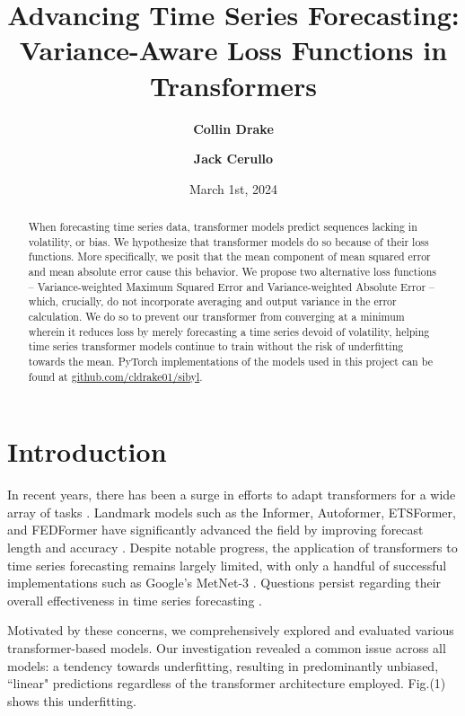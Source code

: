 \documentclass{article}
\title{\textbf{Advancing Time Series Forecasting: Variance-Aware Loss Functions in Transformers}}
\author{\textbf{Collin Drake}}
\author{\textbf{Jack Cerullo}}
\affil[1]{Peak to Peak Charter School}
\date{March 1st, 2024}
\begin{document}
\maketitle

\begin{abstract}

When forecasting time series data, transformer models predict sequences lacking in volatility, or bias. We hypothesize that transformer models do so because of their loss functions. More specifically, we posit that the mean component of mean squared error and mean absolute error cause this behavior. We propose two alternative loss functions – Variance-weighted Maximum Squared Error and Variance-weighted Absolute Error – which, crucially, do not incorporate averaging and output variance in the error calculation. We do so to prevent our transformer from converging at a minimum wherein it reduces loss by merely forecasting a time series devoid of volatility, helping time series transformer models continue to train without the risk of underfitting towards the mean. PyTorch implementations of the models used in this project can be found at \href{https://github.com/cldrake01/sibyl}{github.com/cldrake01/sibyl}.

\end{abstract}

\section{Introduction}

In recent years, there has been a surge in efforts to adapt transformers for a wide array of tasks \cite{wen2023transformers}. Landmark models such as the Informer, Autoformer, ETSFormer, and FEDFormer have significantly advanced the field by improving forecast length and accuracy \cite{zhou2021informer, wu2022autoformer, woo2022etsformer, zhou2022fedformer}. Despite notable progress, the application of transformers to time series forecasting remains largely limited, with only a handful of successful implementations such as Google's MetNet-3 \cite{andrychowicz2023deep}. Questions persist regarding their overall effectiveness in time series forecasting \cite{Zeng_Chen_Zhang_Xu_2023}.

Motivated by these concerns, we comprehensively explored and evaluated various transformer-based models. Our investigation revealed a common issue across all models: a tendency towards underfitting, resulting in predominantly unbiased, ``linear" predictions regardless of the transformer architecture employed. Fig.(1) shows this underfitting.
\end{document}
